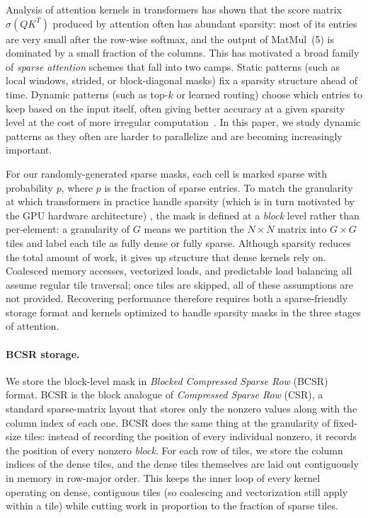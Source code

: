 \documentclass[11pt]{article}
\begin{document}
Analysis of attention kernels in transformers has shown that the score matrix $\sigma(QK^T)$ produced by attention often has abundant sparsity: most of its entries are very small after the row-wise softmax, and the output of MatMul~(5) is dominated by a small fraction of the columns. This has motivated a broad family of \emph{sparse attention} schemes that fall into two camps. Static patterns (such as local windows, strided, or block-diagonal masks) fix a sparsity structure ahead of time. Dynamic patterns (such as top-$k$ or learned routing) choose which entries to keep based on the input itself, often giving better accuracy at a given sparsity level at the cost of more irregular computation~\cite{lin2021survey}. In this paper, we study dynamic patterns as they often are harder to parallelize and are becoming increasingly important. 

For our randomly-generated sparse masks, each cell is marked sparse with probability $p$, where $p$ is the fraction of sparse entries. To match the granularity at which transformers in practice handle sparsity (which is in turn motivated by the GPU hardware architecture) \cite{gale2020sparse}, the mask is defined at a \emph{block} level rather than per-element: a granularity of $G$ means we partition the $N \times N$ matrix into $G \times G$ tiles and label each tile as fully dense or fully sparse. Although sparsity reduces the total amount of work, it gives up structure that dense kernels rely on. Coalesced memory accesses, vectorized loads, and predictable load balancing all assume regular tile traversal; once tiles are skipped, all of these assumptions are not provided. Recovering performance therefore requires both a sparse-friendly storage format and kernels optimized to handle sparsity masks in the three stages of attention.

\paragraph{BCSR storage.}
We store the block-level mask in \emph{Blocked Compressed Sparse Row} (BCSR) format. BCSR is the block analogue of \emph{Compressed Sparse Row} (CSR), a standard sparse-matrix layout that stores only the nonzero values along with the column index of each one. BCSR does the same thing at the granularity of fixed-size tiles: instead of recording the position of every individual nonzero, it records the position of every nonzero \emph{block}. For each row of tiles, we store the column indices of the dense tiles, and the dense tiles themselves are laid out contiguously in memory in row-major order. This keeps the inner loop of every kernel operating on dense, contiguous tiles (so coalescing and vectorization still apply within a tile) while cutting work in proportion to the fraction of sparse tiles.
\end{document}
